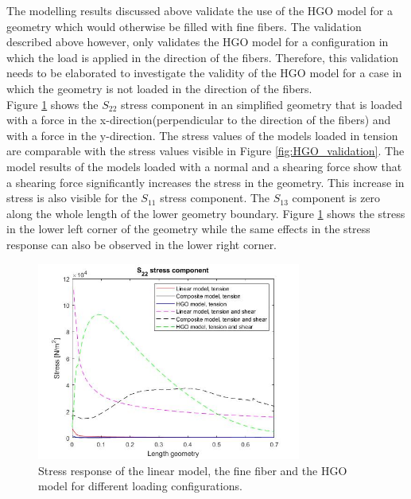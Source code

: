 \qquad The modelling results discussed above validate the use of the HGO model for a geometry which would otherwise be filled with fine fibers. The validation described above however, only validates the HGO model for a configuration in which the load is applied in the direction of the fibers. Therefore, this validation needs to be elaborated to investigate the validity of the HGO model for a case in which the geometry is not loaded in the direction of the fibers.\\


\qquad Figure \ref{fig:HGO_validation_1} shows the $S_{22}$ stress component in an simplified geometry that is loaded with a force in the x-direction(perpendicular to the direction of the fibers) and with a force in the y-direction. The stress values of the models loaded in tension are comparable with the stress values visible in Figure \ref{fig:HGO_validation}. The model results of the models loaded with a normal and a shearing force show that a shearing force significantly increases the stress in the geometry. This increase in stress is also visible for the $S_{11}$ stress component. The $S_{13}$ component is zero along the whole length of the lower geometry boundary. Figure \ref{fig:HGO_validation_1} shows the stress in the lower left corner of the geometry while the same effects in the stress response can also be observed in the lower right corner.\\  

\begin{figure}[h!]
\includegraphics[width=0.7\linewidth, height=6.5cm, angle=0]{images/HGO_model_validation/comparison_all_data.jpg}
\caption{Stress response of the linear model, the fine fiber and the HGO model for different loading configurations.}
\label{fig:HGO_validation_1}
\end{figure}

